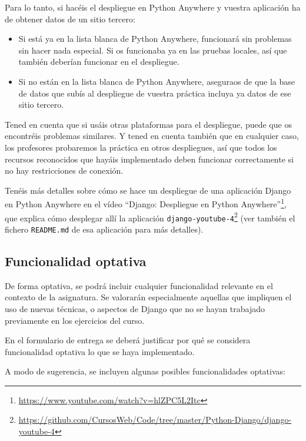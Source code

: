 Para lo tanto, si hacéis el despliegue en Python Anywhere y vuestra aplicación ha de obtener datos de un sitio tercero:

\begin{itemize}
  \item Si está ya en la lista blanca de Python Anywhere, funcionará sin problemas sin hacer nada especial. Si os funcionaba ya en las pruebas locales, así que también deberían funcionar en el despliegue.
  \item Si no están en la lista blanca de Python Anywhere, aseguraos de que la base de datos que subís al despliegue de vuestra práctica incluya ya datos de ese sitio tercero.
\end{itemize}

Tened en cuenta que si usáis otras plataformas para el despliegue, puede que os encontréis problemas similares. Y tened en cuenta también que en cualquier caso, los profesores probaremos la práctica en otros despliegues, así que todos los recursos reconocidos que hayáis implementado deben funcionar correctamente si no hay restricciones de conexión.

Tenéis más detalles sobre cómo se hace un despliegue de una aplicación Django en Python Anywhere en el vídeo ``Django: Despliegue en Python Anywhere''\footnote{\url{https://www.youtube.com/watch?v=hlZPC5L2Itc}}, que explica cómo desplegar allí la aplicación \texttt{django-youtube-4}\footnote{\url{https://github.com/CursosWeb/Code/tree/master/Python-Django/django-youtube-4}} (ver también el fichero \texttt{README.md} de esa aplicación para más detalles).

\subsection{Funcionalidad optativa}

De forma optativa, se podrá incluir cualquier funcionalidad relevante en el contexto de la asignatura. Se valorarán especialmente aquellas que impliquen el uso de nuevas técnicas, o aspectos de Django que no se hayan trabajado previamente en los ejercicios del curso.

En el formulario de entrega se deberá justificar por qué se considera funcionalidad optativa lo que se haya implementado.

A modo de sugerencia, se incluyen algunas posibles funcionalidades optativas:

